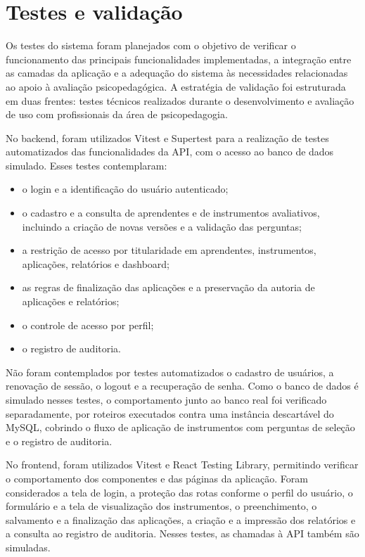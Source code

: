 \chapter[Testes e validação]{Testes e validação} \label{capitulo14}

Os testes do sistema foram planejados com o objetivo de verificar o funcionamento das principais funcionalidades implementadas, a integração entre as camadas da aplicação e a adequação do sistema às necessidades relacionadas ao apoio à avaliação psicopedagógica. A estratégia de validação foi estruturada em duas frentes: testes técnicos realizados durante o desenvolvimento e avaliação de uso com profissionais da área de psicopedagogia.

No backend, foram utilizados Vitest e Supertest para a realização de testes automatizados das funcionalidades da API, com o acesso ao banco de dados simulado. Esses testes contemplaram:
\begin{itemize}
    \item o login e a identificação do usuário autenticado;
    \item o cadastro e a consulta de aprendentes e de instrumentos avaliativos, incluindo a criação de novas versões e a validação das perguntas;
    \item a restrição de acesso por titularidade em aprendentes, instrumentos, aplicações, relatórios e dashboard;
    \item as regras de finalização das aplicações e a preservação da autoria de aplicações e relatórios;
    \item o controle de acesso por perfil;
    \item o registro de auditoria.
\end{itemize}
Não foram contemplados por testes automatizados o cadastro de usuários, a renovação de sessão, o logout e a recuperação de senha. Como o banco de dados é simulado nesses testes, o comportamento junto ao banco real foi verificado separadamente, por roteiros executados contra uma instância descartável do MySQL, cobrindo o fluxo de aplicação de instrumentos com perguntas de seleção e o registro de auditoria.

No frontend, foram utilizados Vitest e React Testing Library, permitindo verificar o comportamento dos componentes e das páginas da aplicação. Foram considerados a tela de login, a proteção das rotas conforme o perfil do usuário, o formulário e a tela de visualização dos instrumentos, o preenchimento, o salvamento e a finalização das aplicações, a criação e a impressão dos relatórios e a consulta ao registro de auditoria. Nesses testes, as chamadas à API também são simuladas.

